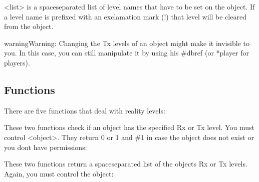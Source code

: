 \documentclass[letterpaper,10pt,english]{sphinxmanual}
\begin{document}
\sphinxAtStartPar
\textless{}list\textgreater{} is a space\sphinxhyphen{}separated list of level names that have to be set on the
object. If a level name is prefixed with an exclamation mark (!) that level
will be cleared from the object.

\begin{sphinxadmonition}{warning}{Warning:}
\sphinxAtStartPar
Changing the Tx levels of an object might make it invisible to you.
In this case, you can still manipulate it by using his \#dbref (or *player
for players).
\end{sphinxadmonition}


\subsection{Functions}
\label{\detokenize{advanced:functions}}
\sphinxAtStartPar
There are five functions that deal with reality levels:

\begin{sphinxVerbatim}[commandchars=\\\{\}]
\end{sphinxVerbatim}

\sphinxAtStartPar
These two functions check if an object has the specified Rx or Tx level.
You must control \textless{}object\textgreater{}. They return 0 or 1 and \#\sphinxhyphen{}1 in case the object
does not exist or you don\textquotesingle{}t have permissions:

\begin{sphinxVerbatim}[commandchars=\\\{\}]
\end{sphinxVerbatim}

\sphinxAtStartPar
These two functions return a space\sphinxhyphen{}separated list of the object\textquotesingle{}s Rx or Tx
levels. Again, you must control the object:

\begin{sphinxVerbatim}[commandchars=\\\{\}]
\end{sphinxVerbatim}
\end{document}
